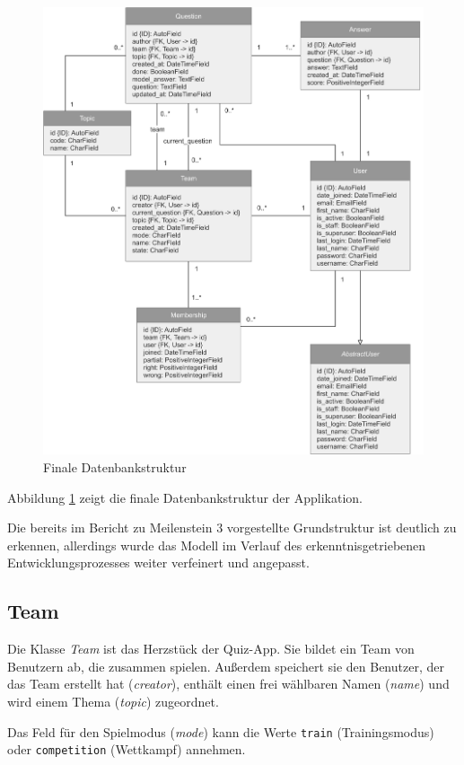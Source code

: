 \documentclass[a4paper,11pt,listof=numbered,glossary=totoc,parskip=half,toc=bib]{scrreprt}
\begin{document}
	\begin{figure}
		\centering
		\includegraphics[width=\textwidth]{UML_Datenmodell}
		\caption{Finale Datenbankstruktur}
		\label{fig:database}
	\end{figure}

	Abbildung \ref{fig:database} zeigt die finale Datenbankstruktur der Applikation.
	
	Die bereits im Bericht zu Meilenstein 3 vorgestellte Grundstruktur ist deutlich zu erkennen, allerdings wurde das Modell im Verlauf des erkenntnisgetriebenen Entwicklungsprozesses weiter verfeinert und angepasst.
	
		\subsection{Team}
	Die Klasse \textit{Team} ist das Herzstück der Quiz-App. Sie bildet ein Team von Benutzern ab, die zusammen spielen. Außerdem speichert sie den Benutzer, der das Team erstellt hat (\textit{creator}), enthält einen frei wählbaren Namen (\textit{name}) und wird einem Thema (\textit{topic}) zugeordnet.
	
	Das Feld für den Spielmodus (\textit{mode}) kann die Werte \texttt{train} (Trainingsmodus) oder \texttt{competition} (Wettkampf) annehmen.
	
\end{document}
